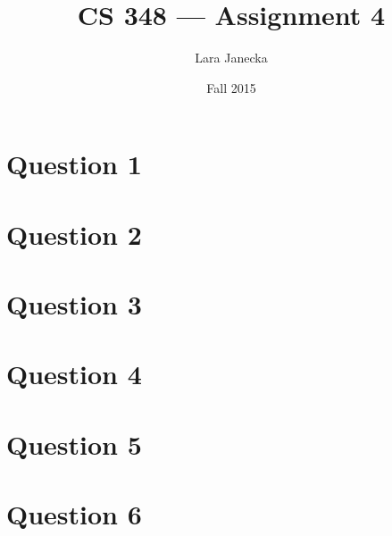 \documentclass[12pt]{article}
\begin{document}
\title{CS 348 --- Assignment 4}
\author{Lara Janecka}
\date{\vspace{-2ex}Fall 2015}
\maketitle\HRule

\section{Question 1}


\section{Question 2}


\section{Question 3}


\section{Question 4}


\section{Question 5}


\section{Question 6}

\end{document}
